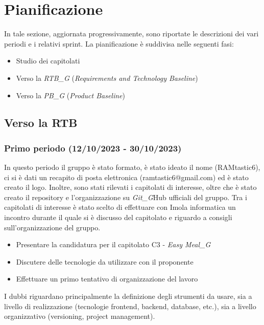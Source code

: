 \section{Pianificazione}
In tale sezione, aggiornata progressivamente, sono riportate le descrizioni dei vari periodi e i relativi sprint.
La pianificazione è suddivisa nelle seguenti fasi:
\begin{itemize}
    \item Studio dei capitolati
    \item Verso la \textit{RTB_G} (\emph{Requirements and Technology Baseline})
    \item Verso la \textit{PB_G} (\emph{Product Baseline})
\end{itemize}
\subsection{Verso la RTB}

\subsubsection{Primo periodo (12/10/2023 - 30/10/2023)}

In questo periodo il gruppo è stato formato, è stato ideato il nome (RAMtastic6), ci si è dati un recapito di posta elettronica (ramtastic6@gmail.com) ed è stato creato il logo. Inoltre, sono stati rilevati i capitolati di interesse, oltre che è stato creato il repository e l'organizzazione su \textit{Git_G}Hub ufficiali del gruppo. Tra i capitolati di interesse è stato scelto di effettuare con Imola informatica un incontro durante il quale si è discusso del capitolato e riguardo a consigli sull'organizzazione del gruppo. 

\begin{itemize}
    \item Presentare la candidatura per il capitolato C3 - \textit{Easy Meal_G}
    \item Discutere delle tecnologie da utilizzare con il proponente
    \item Effettuare un primo tentativo di organizzazione del lavoro
\end{itemize}

I dubbi riguardano principalmente la definizione degli strumenti da usare, sia a livello di realizzazione (tecnologie frontend,
backend, database, etc.), sia a livello organizzativo (versioning, project management).

